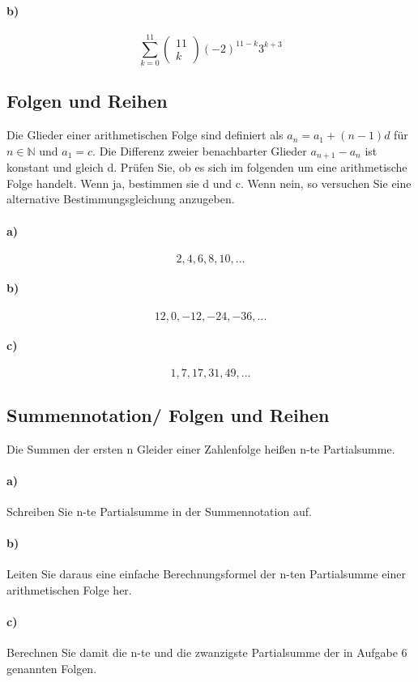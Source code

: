 \documentclass[paper=a4, fontsize=11pt]{scrartcl}
\numberwithin{equation}{section}
\numberwithin{figure}{section}
\numberwithin{table}{section}
\begin{document}
\paragraph{b)}
$$\sum^{11}_{k=0} \left(\begin{array}{c} 11 \\ k \end{array}\right) (-2)^{11-k} 3^{k+3}$$

\subsection{Folgen und Reihen}
Die Glieder einer arithmetischen Folge sind definiert als $a_{n}=a_{1}+(n-1)d$ für $n \in \mathbb{N}$ und $a_{1}=c$. Die Differenz zweier benachbarter Glieder $a_{n+1}-a_{n}$ ist konstant und gleich d. Prüfen Sie, ob es sich im folgenden um eine arithmetische Folge handelt. Wenn ja, bestimmen sie d und c. Wenn nein, so versuchen Sie eine alternative Bestimmungsgleichung anzugeben.
\paragraph{a)}
$$2,4,6,8,10,...$$

\paragraph{b)}
$$12,0,-12,-24,-36,...$$

\paragraph{c)}
$$1,7,17,31,49,...$$

\subsection{Summennotation/ Folgen und Reihen}
Die Summen der ersten n Gleider einer Zahlenfolge heißen n-te Partialsumme.
\paragraph{a)}
Schreiben Sie n-te Partialsumme in der Summennotation auf.

\paragraph{b)}
Leiten Sie daraus eine einfache Berechnungsformel der n-ten Partialsumme einer arithmetischen Folge her.

\paragraph{c)}
Berechnen Sie damit die n-te und die zwanzigste Partialsumme der in Aufgabe 6 genannten Folgen.

\end{document}
